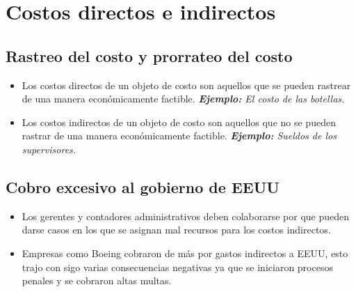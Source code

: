 \documentclass{article}
\begin{document}
\section{Costos directos e indirectos}
\subsection{Rastreo del costo y prorrateo del costo}
\begin{itemize}
    \item Los costos directos de un objeto de costo son aquellos que se pueden rastrear de una manera económicamente factible. \emph{\textbf{Ejemplo: }El costo de las botellas.}
    \item Los costos indirectos de un objeto de costo son aquellos que no se pueden rastrar de una manera económicamente factible. \emph{\textbf{Ejemplo: }Sueldos de los supervisores.}
\end{itemize}
\subsection{Cobro excesivo al gobierno de EEUU}
\begin{itemize}
    \item Los gerentes y contadores administrativos deben colaborarse por que pueden darse casos en los que se asignan mal recursos para los costos indirectos.
    \item Empresas como Boeing cobraron de más por gastos indirectos a EEUU, esto trajo con sigo varias consecuencias negativas ya que se iniciaron procesos penales y se cobraron altas multas.
\end{itemize}
\end{document}

